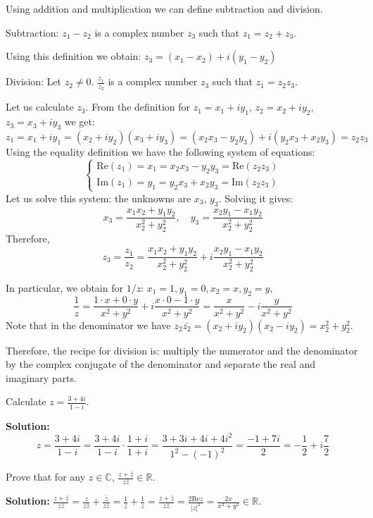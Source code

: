 \documentclass[12pt]{article}
\newcommand{\R}{\mathbb{R}}
\newcommand{\Rea}{\text{Re}}
\newcommand{\Ima}{\text{Im}}
\begin{document}
Using addition and multiplication we can define subtraction and division.
\begin{definition}
Subtraction: $z_1-z_2$ is a complex number $z_3$ such that $z_1 = z_2+z_3$.
\end{definition}
Using this definition we obtain: $z_3 = (x_1-x_2) + i(y_1-y_2)$

\begin{definition}
Division: Let $z_2 \neq 0$. $\frac{z_1}{z_2}$ is a complex number $z_3$ such that $z_1 = z_2z_3$.
\end{definition}
Let us calculate $z_3$. From the definition for $z_1 = x_1+iy_1$, $z_2 = x_2+iy_2$, $z_3=x_3+iy_3$ we get:
$z_1 = x_1 + iy_1 = (x_2+iy_2)(x_3+iy_3) = (x_2x_3-y_2y_3) + i (y_2x_3+x_2y_3) = z_2z_3$
Using the equality definition we have the following system of equations:
\begin{equation*}
\begin{cases}
\Rea(z_1) = x_1 = x_2x_3-y_2y_3 = \Rea(z_2z_3)\\
\Ima(z_1) = y_1 = y_2x_3+x_2y_3 = \Ima(z_2z_3)
\end{cases}
\end{equation*}
Let us solve this system: the unknowns are $x_3$, $y_3$. Solving it gives:
\[ x_3 = \frac{x_1x_2+y_1y_2}{x_2^2+y_2^2}, \quad y_3 = \frac{x_2y_1-x_1y_2}{x_2^2+y_2^2} \]
Therefore,
\[ z_3 = \frac{z_1}{z_2} = \frac{x_1x_2+y_1y_2}{x_2^2+y_2^2} + i \frac{x_2y_1-x_1y_2}{x_2^2+y_2^2} \]

In particular, we obtain for $1/z$: $x_1=1, y_1=0, x_2=x, y_2=y$,
\[ \frac{1}{z} = \frac{1 \cdot x+ 0 \cdot y}{x^2+y^2} +i \frac{x \cdot 0 - 1 \cdot y}{x^2+y^2} = \frac{x}{x^2+y^2} -i \frac{y}{x^2+y^2} \]
Note that in the denominator we have $z_2\bar{z_2} = (x_2+iy_2)(x_2-iy_2) = x_2^2+y_2^2$.

Therefore, the recipe for division is: multiply the numerator and the denominator by the complex conjugate of the denominator and separate the real and imaginary parts.

\begin{example}
Calculate $z=\frac{3+4i}{1-i}$.

\textbf{Solution:}
\[ z = \frac{3+4i}{1-i} = \frac{3+4i}{1-i} \cdot \frac{1+i}{1+i} = \frac{3+3i+4i+4i^2}{1^2-(-1)^2} = \frac{-1+7i}{2} = -\frac{1}{2} + i\frac{7}{2} \]
\end{example}

\begin{example}
 Prove that for any $z\in\mathbb{C}$, $\frac{z+\bar{z}}{z\bar{z}} \in \R$.
 
 \textbf{Solution:} $\frac{z+\bar{z}}{z\bar{z}} = \frac{z}{z\bar{z}} + \frac{\bar{z}}{z\bar{z}} = \frac{1}{\bar{z}} + \frac{1}{z} = \frac{z+\bar{z}}{z\bar{z}} = \frac{2\Rea z}{|z|^2} = \frac{2x}{x^2+y^2} \in \R$.
\end{example}
\end{document}
